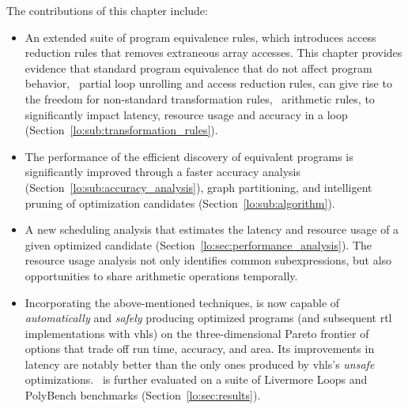 The contributions of this chapter include:
\begin{itemize}

    \item An extended suite of program equivalence rules, which introduces
    access reduction rules that removes extraneous array accesses.  This
    chapter provides evidence that standard program equivalence that do not
    affect program behavior, \eg~partial loop unrolling and access reduction
    rules, can give rise to the freedom for non-standard transformation rules,
    \eg~arithmetic rules, to significantly impact latency, resource usage and
    accuracy in a loop (Section~\ref{lo:sub:transformation_rules}).

    \item The performance of the efficient discovery of equivalent
    programs is significantly improved through a faster accuracy
    analysis (Section~\ref{lo:sub:accuracy_analysis}), graph
    partitioning, and intelligent pruning of optimization candidates
    (Section~\ref{lo:sub:algorithm}).

    \item A new scheduling analysis that estimates the
    latency and resource usage of a given optimized candidate
    (Section~\ref{lo:sec:performance_analysis}).  The resource usage analysis
    not only identifies common subexpressions, but also opportunities to share
    arithmetic operations temporally.

    \item Incorporating the above-mentioned techniques, \soap{} is now
    capable of \emph{automatically} and \emph{safely} producing optimized
    programs (and subsequent \gls{rtl} implementations with \gls{vhls}) on
    the three-dimensional Pareto frontier of options that trade off run time,
    accuracy, and area.  Its improvements in latency are notably better than
    the only ones produced by \gls{vhls}'s \emph{unsafe} optimizations.
    \soap~is further evaluated on a suite of Livermore Loops and PolyBench
    benchmarks (Section~\ref{lo:sec:results}).

\end{itemize}

